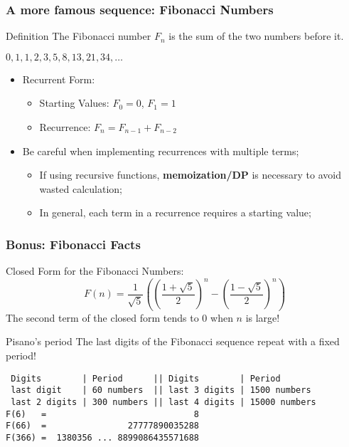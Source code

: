 \begin{frame}
  \frametitle{A more famous sequence: Fibonacci Numbers}

  \begin{block}{Definition}
    The Fibonacci number $F_n$ is the sum of the two numbers before it.\medskip

    $0, 1, 1, 2, 3, 5, 8, 13, 21, 34, \ldots$
  \end{block}\bigskip

  \begin{itemize}
    \item Recurrent Form:
    \begin{itemize}
      \item Starting Values: $F_0 = 0$, $F_1 = 1$
      \item Recurrence: $F_n = F_{n-1} + F_{n-2}$
    \end{itemize}\bigskip

    \item Be careful when implementing recurrences with multiple terms;
    \begin{itemize}
      \item If using recursive functions, {\bf memoization/DP} is necessary to avoid wasted calculation;
      \item In general, each term in a recurrence requires a starting value;
    \end{itemize}
  \end{itemize}
\end{frame}

\begin{frame}[fragile]
  \frametitle{Bonus: Fibonacci Facts}
  \begin{block}{Closed Form for the Fibonacci Numbers:}
    \begin{equation*}
      F(n) = \frac{1}{\sqrt{5}}\left(\left(\frac{1+\sqrt{5}}{2}\right)^n-\left(\frac{1-\sqrt{5}}{2}\right)^n\right)
    \end{equation*}
    The second term of the closed form tends to 0 when $n$ is large!
  \end{block}

  \begin{block}{Pisano's period}
    The last digits of the Fibonacci sequence repeat with a fixed period!\smallskip
{\smaller
\begin{verbatim}
 Digits        | Period      || Digits        | Period
 last digit    | 60 numbers  || last 3 digits | 1500 numbers
 last 2 digits | 300 numbers || last 4 digits | 15000 numbers
F(6)   =                             8
F(66)  =                27777890035288
F(366) =  1380356 ... 8899086435571688
\end{verbatim}}
  \end{block}
\end{frame}

